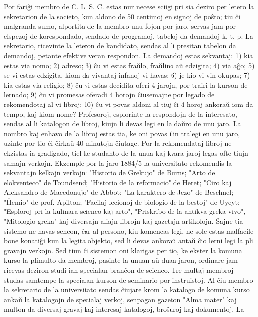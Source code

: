    Por fari\^gi membro de C. L. S. C. estas nur necese sciigi pri sia
deziro per letero la sekretarion de la societo, kun aldono de 50
centimoj en signoj de po\^sto; tiu \^ci malgranda sumo, alportita de
la membro unu fojon por jaro, servas jam por elspezoj de
korespondado, sendado de programoj, tabeloj da demandoj k. t. p. La
sekretario, ricevinte la leteron de kandidato, sendas al li presitan
tabelon da demandoj, petante efektive veran respondon. La demandoj
estas sekvantaj: 1) kia estas via nomo; 2) adreso; 3) \^cu vi estas
fra\u ulo, fra\u ulino a\u u edzigita; 4) via a\^go; 5) se vi estas
edzigita, kiom da vivantaj infanoj vi havas; 6) je kio vi vin
okupas; 7) kia estas via religio; 8) \^cu vi estas decidita oferi 4
jarojn, por trairi la kurson de lernado; 9) \^cu vi promesas oferadi
4 horojn \^ciusemajne por legado de rekomendotaj al vi libroj; 10)
\^cu vi povas aldoni al tiuj \^ci 4 horoj ankora\u u iom da tempo,
kaj kiom nome? Profesoroj, esplorinte la respondojn de la
interesato, sendas al li katalogon de libroj, kiujn li devas legi en
la da\u uro de unu jaro. La nombro kaj enhavo de la libroj estas
tia, ke oni povas ilin tralegi en unu jaro, uzinte por tio \^ci
\^cirka\u u 40 minutojn \^ciutage. Por la rekomendataj libroj ne
ekzistas ia gradigado, tiel ke studanto de la unua kaj kvara jaroj
legas ofte tiujn samajn verkojn. Ekzemple por la jaro 1884/5 la
universitato rekomendis la sekvantajn kelkajn verkojn: "Historio de
Grekujo" de Burns; "Arto de elokventeco" de Toundsend; "Historio
de la reformacio" de Heret; "Ciro kaj Aleksandro de Macedonujo"
de Abbot; "La karaktero de Jezo" de Beschnel; "\^Hemio" de prof.
Apilton; "Facilaj lecionoj de biologio de la bestoj" de Uyeyt;
"Esploroj pri la kulinara scienco kaj arto", "Priskribo de la
antikva greka vivo", "Mitologio greka" kaj diversajn aliajn
librojn kaj gazetajn artikolojn. \^Sajne tia sistemo ne havas
sencon, \^car al persono, kiu komencas legi, ne sole estas malfacile
bone konati\^gi kun la legita objekto, sed li devas ankora\u u
anta\u u \^cio lerni legi la pli gravajn verkojn. Sed tiun \^ci
sistemon oni klarigas per tio, ke ekster la komuna kurso la plimulto
da membroj, pasinte la unuan a\u u duan jaron, ordinare jam ricevas
deziron studi ian specialan bran\^con de scienco. Tre multaj membroj
studas samtempe la specialan kurson de seminario por instruistoj. Al
\^ciu membro la sekretario de la universitato sendas \^ciujare krom
la katalogo de komuna kurso anka\u u la katalogojn de specialaj
verkoj, senpagan gazeton "Alma mater" kaj multon da diversaj
gravaj kaj interesaj katalogoj, bro\^suroj kaj dokumentoj. La
